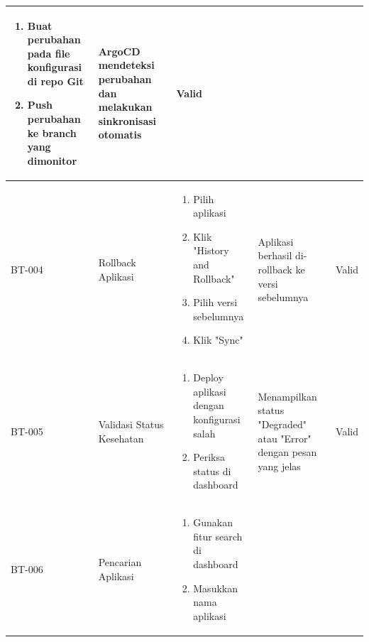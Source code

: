 \begin{table}[h]
\begin{adjustbox}{width=\textwidth}
\begin{tabular}{|p{0.8cm}|p{2.2cm}|p{4cm}|p{3.5cm}|p{1.2cm}|}
\begin{enumerate}[leftmargin=*,noitemsep,topsep=0pt,label=\arabic*.,widest=99]
                                                        \item Buat perubahan pada file konfigurasi di repo Git
                                                        \item Push perubahan ke branch yang dimonitor
                                                      \end{enumerate} & ArgoCD mendeteksi perubahan dan melakukan sinkronisasi otomatis    & Valid                                                            \\ \hline
      BT-004            & Rollback Aplikasi         & \begin{enumerate}[leftmargin=*,noitemsep,topsep=0pt,label=\arabic*.,widest=99]
                                                        \item Pilih aplikasi
                                                        \item Klik "History and Rollback"
                                                        \item Pilih versi sebelumnya
                                                        \item Klik "Sync"
                                                      \end{enumerate} & Aplikasi berhasil di-rollback ke versi sebelumnya                  & Valid                                                            \\ \hline
      BT-005            & Validasi Status Kesehatan & \begin{enumerate}[leftmargin=*,noitemsep,topsep=0pt,label=\arabic*.,widest=99]
                                                        \item Deploy aplikasi dengan konfigurasi salah
                                                        \item Periksa status di dashboard
                                                      \end{enumerate} & Menampilkan status "Degraded" atau "Error" dengan pesan yang jelas & Valid                                                            \\ \hline
      BT-006            & Pencarian Aplikasi        & \begin{enumerate}[leftmargin=*,noitemsep,topsep=0pt,label=\arabic*.,widest=99]
                                                        \item Gunakan fitur search di dashboard
                                                        \item Masukkan nama aplikasi

\end{enumerate}
\end{tabular}
\end{adjustbox}
\end{table}
